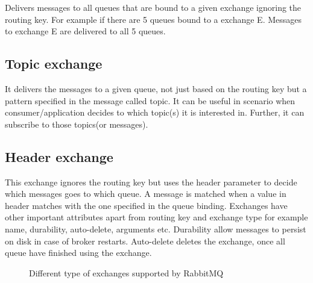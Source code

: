 \documentclass[9pt,twocolumn,twoside]{styles/osajnl}
\begin{document}
Delivers messages to all queues that are bound to a given exchange ignoring the routing key. For example if there are 5 queues bound to a exchange E. Messages to exchange E are delivered to all 5 queues.

\subsection{Topic exchange}

It delivers the messages to a given queue, not just based on the routing key but a pattern specified in the message called topic. It can be useful in scenario when consumer/application decides to which topic(s) it is interested in. Further, it can subscribe to those topics(or messages).

\subsection{Header exchange}

This exchange ignores the routing key but uses the header parameter to decide which messages goes to which queue. A message is matched when a value in header matches with the one specified in the queue binding.
Exchanges have other important attributes apart from routing key and exchange type for example name, durability, auto-delete, arguments etc. Durability allow messages to persist on disk in case of broker restarts. Auto-delete deletes the exchange, once all queue have finished using the exchange.

\begin{figure}[htbp]
\centering
{}
\caption{Different type of exchanges supported by RabbitMQ}\cite{www-rabbitmq-Johan}
\label{fig:false-color}
\end{figure}
\end{document}
